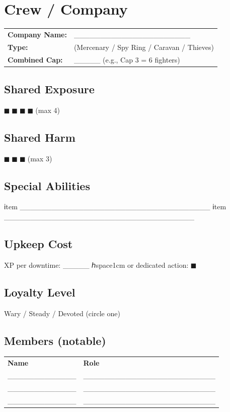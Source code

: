 \documentclass[11pt]{article}
\begin{document}
\section*{Crew / Company}

\noindent
\begin{tabularx}{\textwidth}{X X}
\textbf{Company Name:} & ______________________ \\
\textbf{Type:} & (Mercenary / Spy Ring / Caravan / Thieves) \\
\textbf{Combined Cap:} & _____ (e.g., Cap 3 = 6 fighters) \\
\end{tabularx}

\subsection*{Shared Exposure}
\noindent $■$ $■$ $■$ $■$ (max 4)

\subsection*{Shared Harm}
\noindent $■$ $■$ $■$ (max 3)

\subsection*{Special Abilities}
\begin{itemize}
  ℹtem ____________________________________
  ℹtem ____________________________________
\end{itemize}

\subsection*{Upkeep Cost}
\noindent XP per downtime: _____ ℎspace{1cm} or dedicated action: $■$

\subsection*{Loyalty Level}
\noindent Wary / Steady / Devoted (circle one)

\subsection*{Members (notable)}
\small
\begin{tabularx}{\textwidth}{p{3cm} X}
\textbf{Name} & \textbf{Role} \\
_____________ & _________________________ \\
_____________ & _________________________ \\
_____________ & _________________________ \\
\end{tabularx}
\normalsize
\end{document}
